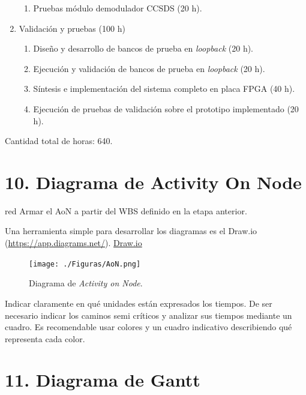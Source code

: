 \documentclass[
11pt, %
]{charter}
\begin{document}
\begin{enumerate}
\begin{enumerate}
		\item Pruebas módulo demodulador CCSDS (20 h).
	\end{enumerate}	
	\item Validación y pruebas (100 h)
	\begin{enumerate}
		\item Diseño y desarrollo de bancos de prueba en \textit{loopback} (20 h).
		\item Ejecución y validación de bancos de prueba en \textit{loopback} (20 h).
		\item Síntesis e implementación del sistema completo en placa FPGA (40 h).
		\item Ejecución de pruebas de validación sobre el prototipo implementado (20 h).
	\end{enumerate}	
	\end{enumerate}		

Cantidad total de horas: 640.

\section{10. Diagrama de Activity On Node}
\label{sec:AoN}

\begin{consigna}{red}
Armar el AoN a partir del WBS definido en la etapa anterior.

Una herramienta simple para desarrollar los diagramas es el Draw.io (\url{https://app.diagrams.net/}).
\href{https://app.diagrams.net}{Draw.io}


\begin{figure}[htpb]
\centering 
\texttt{[image: ./Figuras/AoN.png]}
\caption{Diagrama de \textit{Activity on Node}.}
\label{fig:AoN}
\end{figure}

Indicar claramente en qué unidades están expresados los tiempos.
De ser necesario indicar los caminos semi críticos y analizar sus tiempos mediante un cuadro.
Es recomendable usar colores y un cuadro indicativo describiendo qué representa cada color.

\end{consigna}

\section{11. Diagrama de Gantt}
\label{sec:gantt}
\end{document}
